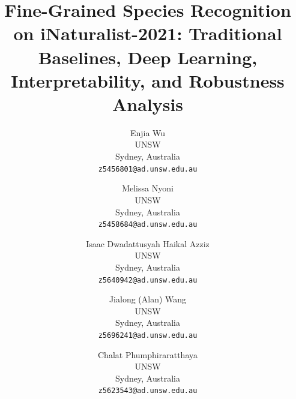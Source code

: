 \documentclass[10pt,twocolumn,letterpaper]{article}
\title{Fine-Grained Species Recognition on iNaturalist-2021: Traditional Baselines, Deep Learning, Interpretability, and Robustness Analysis}
\author{Enjia Wu\\
UNSW\\
Sydney, Australia\\
{\tt\small z5456801@ad.unsw.edu.au}
\and
Melissa Nyoni\\
UNSW\\
Sydney, Australia\\
{\tt\small z5458684@ad.unsw.edu.au}
\and
Isaac Dwadattusyah Haikal Azziz\\
UNSW\\
Sydney, Australia\\
{\tt\small z5640942@ad.unsw.edu.au}
\and
Jialong (Alan) Wang\\
UNSW\\
Sydney, Australia\\
{\tt\small z5696241@ad.unsw.edu.au}
\and
Chalat Phumphiraratthaya\\
UNSW\\
Sydney, Australia\\
{\tt\small z5623543@ad.unsw.edu.au}
}
\begin{document}
\maketitle







{
    \small
    
    
}


\end{document}
